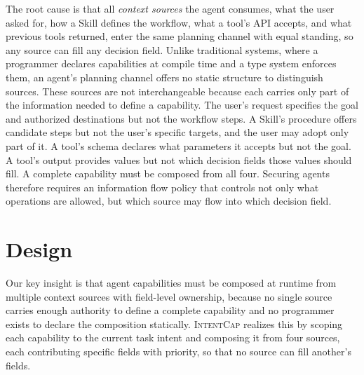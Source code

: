 \documentclass[sigconf,nonacm]{acmart}
\newcommand{\sys}{\textsc{IntentCap}\xspace}
\begin{document}
The root cause is that all \emph{context sources} the agent consumes, what the user asked for, how a Skill defines the workflow, what a tool's API accepts, and what previous tools returned, enter the same planning channel with equal standing, so any source can fill any decision field.
Unlike traditional systems, where a programmer declares capabilities at compile time and a type system enforces them, an agent's planning channel offers no static structure to distinguish sources.
These sources are not interchangeable because each carries only part of the information needed to define a capability. The user's request specifies the goal and authorized destinations but not the workflow steps. A Skill's procedure offers candidate steps but not the user's specific targets, and the user may adopt only part of it. A tool's schema declares what parameters it accepts but not the goal. A tool's output provides values but not which decision fields those values should fill. A complete capability must be composed from all four.
Securing agents therefore requires an information flow policy that controls not only what operations are allowed, but which source may flow into which decision field.

\section{Design}
\label{sec:design}

Our key insight is that agent capabilities must be composed at runtime from multiple context sources with field-level ownership, because no single source carries enough authority to define a complete capability and no programmer exists to declare the composition statically.
\sys realizes this by scoping each capability to the current task intent and composing it from four sources, each contributing specific fields with priority, so that no source can fill another's fields.
\end{document}
